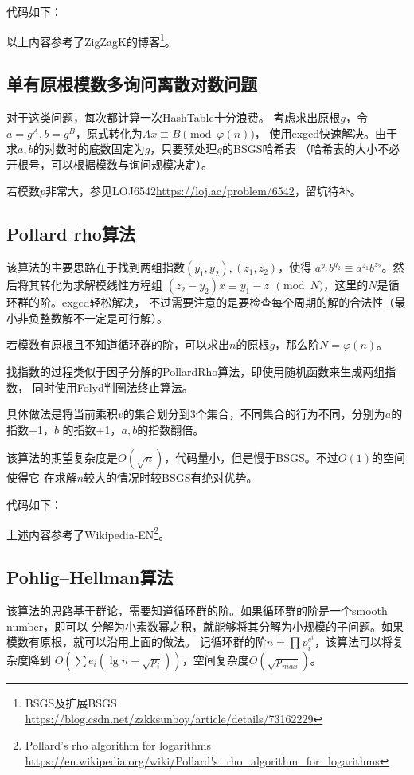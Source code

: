 代码如下：


以上内容参考了ZigZagK的博客\footnote{BSGS及扩展BSGS\\
\url{https://blog.csdn.net/zzkksunboy/article/details/73162229}}。
\subsection{单有原根模数多询问离散对数问题}
对于这类问题，每次都计算一次HashTable十分浪费。
考虑求出原根$g$，令$a=g^A,b=g^B$，原式转化为$Ax\equiv B\pmod{\varphi(n)}$，
使用exgcd快速解决。由于求$a,b$的对数时的底数固定为$g$，只要预处理$g$的BSGS哈希表
（哈希表的大小不必开根号，可以根据模数与询问规模决定）。

若模数$p$非常大，参见LOJ6542\url{https://loj.ac/problem/6542}，留坑待补。

\subsection{Pollard rho算法}

该算法的主要思路在于找到两组指数$(y_1,y_2),(z_1,z_2)$，使得
$a^{y_1}b^{y_2}\equiv a^{z_1}b^{z_2}$。然后将其转化为求解模线性方程组
$(z_2-y_2)x\equiv y_1-z_1\pmod{N}$，这里的$N$是循环群的阶。exgcd轻松解决，
不过需要注意的是要检查每个周期的解的合法性（最小非负整数解不一定是可行解）。

若模数有原根且不知道循环群的阶，可以求出$n$的原根$g$，那么阶$N=\varphi(n)$。

找指数的过程类似于因子分解的PollardRho算法，即使用随机函数来生成两组指数，
同时使用Folyd判圈法终止算法。

具体做法是将当前乘积$v$的集合划分到3个集合，不同集合的行为不同，分别为$a$的指数+1，$b$
的指数+1，$a,b$的指数翻倍。

该算法的期望复杂度是$O(\sqrt{n})$，代码量小，但是慢于BSGS。不过$O(1)$的空间使得它
在求解$n$较大的情况时较BSGS有绝对优势。

代码如下：


上述内容参考了Wikipedia-EN\footnote{
    Pollard's rho algorithm for logarithms
    \url{https://en.wikipedia.org/wiki/Pollard's\_rho\_algorithm\_for\_logarithms}
}。
\subsection{Pohlig–Hellman算法}\label{PHDL}
该算法的思路基于群论，需要知道循环群的阶。如果循环群的阶是一个smooth number，即可以
分解为小素数幂之积，就能够将其分解为小规模的子问题。如果模数有原根，就可以沿用上面的做法。
记循环群的阶$n=\displaystyle \prod{p_i^{e^i}}$，该算法可以将复杂度降到
$O(\displaystyle \sum{e_i(\lg n+\sqrt{p_i})})$，空间复杂度$O(\sqrt{p_{max}})$。

